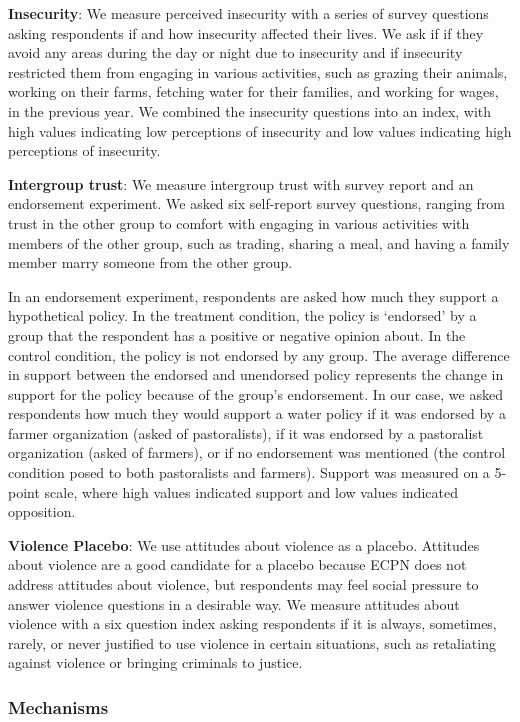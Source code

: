 \documentclass[11pt]{article}
\begin{document}
\textbf{Insecurity}: We measure perceived insecurity with a series of
survey questions asking respondents if and how insecurity affected their
lives. We ask if if they avoid any areas during the day or night due to
insecurity and if insecurity restricted them from engaging in various
activities, such as grazing their animals, working on their farms,
fetching water for their families, and working for wages, in the
previous year. We combined the insecurity questions into an index, with
high values indicating low perceptions of insecurity and low values
indicating high perceptions of insecurity.

\textbf{Intergroup trust}: We measure intergroup trust with survey
report and an endorsement experiment. We asked six self-report survey
questions, ranging from trust in the other group to comfort with
engaging in various activities with members of the other group, such as
trading, sharing a meal, and having a family member marry someone from
the other group.

In an endorsement experiment, respondents are asked how much they
support a hypothetical policy. In the treatment condition, the policy is
`endorsed' by a group that the respondent has a positive or negative
opinion about. In the control condition, the policy is not endorsed by
any group. The average difference in support between the endorsed and
unendorsed policy represents the change in support for the policy
because of the group's endorsement. In our case, we asked respondents
how much they would support a water policy if it was endorsed by a
farmer organization (asked of pastoralists), if it was endorsed by a
pastoralist organization (asked of farmers), or if no endorsement was
mentioned (the control condition posed to both pastoralists and
farmers). Support was measured on a 5-point scale, where high values
indicated support and low values indicated opposition.

\textbf{Violence Placebo}: We use attitudes about violence as a placebo.
Attitudes about violence are a good candidate for a placebo because ECPN
does not address attitudes about violence, but respondents may feel
social pressure to answer violence questions in a desirable way. We
measure attitudes about violence with a six question index asking
respondents if it is always, sometimes, rarely, or never justified to
use violence in certain situations, such as retaliating against violence
or bringing criminals to justice.

\hypertarget{mechanisms}{%
\subsubsection{Mechanisms}\label{mechanisms}}
\end{document}
